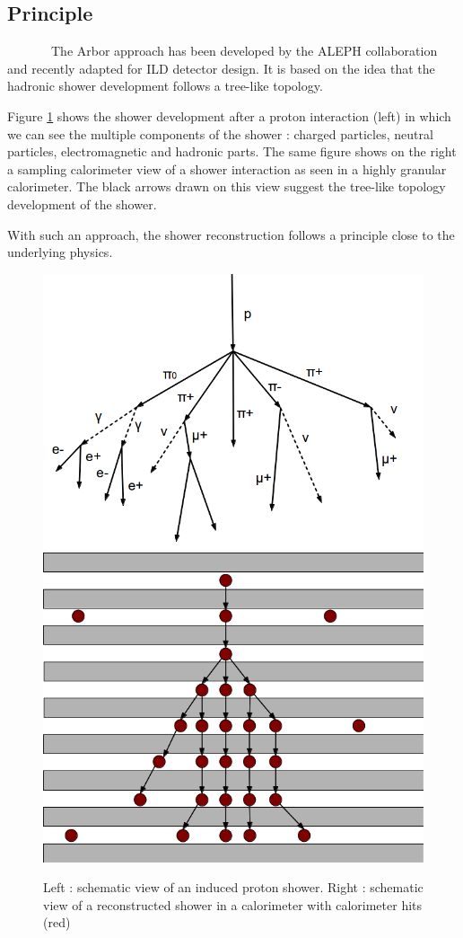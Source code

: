 \documentclass[cits]{JINST}
\begin{document}
\subsection{Principle} 

~~~~~~~The Arbor approach has been developed by the ALEPH collaboration and recently adapted \cite{arbor-manqi} for ILD detector design. It is based on the idea that the hadronic shower development follows a tree-like topology.

Figure \ref{ARBOR_STRUCTURE} shows the shower development after a proton interaction (left) in which we can see the multiple components of the shower : charged particles, neutral particles, electromagnetic and hadronic parts.
The same figure shows on the right a sampling calorimeter view of a shower interaction as seen in a highly granular calorimeter. The black arrows drawn on this view suggest the tree-like topology development of the shower.

With such an approach, the shower reconstruction follows a principle close to the underlying physics.%
  
\begin{figure}[!ht]
  \begin{center}
    \includegraphics[width=0.45\linewidth]{ProtonDecay.png} \hfill
    \includegraphics[width=0.45\linewidth]{ArborSchema.png}
  \end{center}
  \caption{\label{ARBOR_STRUCTURE} Left : schematic view of an induced proton shower. Right : schematic view of a reconstructed shower in a calorimeter with calorimeter hits (red)}
\end{figure}
\end{document}
